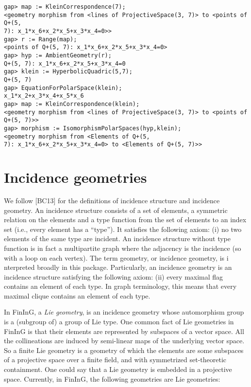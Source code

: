 \documentclass{article}
\def\fining{{\sf FinInG}}
\begin{document}
\begin{verbatim}
gap> map := KleinCorrespondence(7);
<geometry morphism from <lines of ProjectiveSpace(3, 7)> to <points of Q+(5, 
7): x_1*x_6+x_2*x_5+x_3*x_4=0>>
gap> r := Range(map);
<points of Q+(5, 7): x_1*x_6+x_2*x_5+x_3*x_4=0>
gap> hyp := AmbientGeometry(r);
Q+(5, 7): x_1*x_6+x_2*x_5+x_3*x_4=0
gap> klein := HyperbolicQuadric(5,7);
Q+(5, 7)
gap> EquationForPolarSpace(klein);
x_1*x_2+x_3*x_4+x_5*x_6
gap> map := KleinCorrespondence(klein);
<geometry morphism from <lines of ProjectiveSpace(3, 7)> to <points of Q+(5, 7)>>
gap> morphism := IsomorphismPolarSpaces(hyp,klein);
<geometry morphism from <Elements of Q+(5, 
7): x_1*x_6+x_2*x_5+x_3*x_4=0> to <Elements of Q+(5, 7)>>
\end{verbatim}

\section{Incidence geometries}

We follow [BC13] for the definitions of incidence structure and incidence geometry. An incidence structure 
consists of a set of elements, a symmetric relation on the elements and a type function from the set of 
elements to an index set (i.e., every element has a ``type''). It satisfies the following axiom: (i) no two elements 
of the same type are incident. An incidence structure without type function is in fact a multipartite graph where 
the adjacency is the incidence (so with a loop on each vertex). The term geometry, or incidence geometry, is i
nterpreted broadly in this package. Particularly, an incidence geometry is an incidence structure satisfying the 
following axiom: (ii) every maximal flag contains an element of each type. In graph terminology, this means that 
every maximal clique contains an element of each type.

In \fining{}, a {\em Lie geometry}, is an incidence geometry whose automorphism group is a (subgroup of) a group
of Lie type. One common fact of Lie geometries in \fining{} is that their elements are represented by subspaces of a 
vector space. All the collineations are induced by semi-linear 
maps of the underlying vector space. So a finite Lie geometry is a geometry of which the elements are some subspaces 
of a projective space over a finite field, and with symmetrized set-theoretic containment. One could say that a Lie geometry
is embedded in a projective space. Currently, in \fining{}, the following geometries are Lie geometries:
\end{document}
